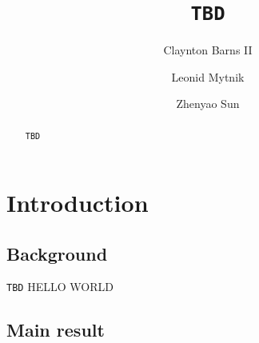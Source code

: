 \documentclass[12pt,a4paper]{amsart}
\numberwithin{equation}{section}
\theoremstyle{plain}
\theoremstyle{remark}
\begin{document}
	\title[]{{\tt TBD}}
	\author[]{Claynton Barns II}
	\address{{\tt TBD}}
	\author[]{Leonid Mytnik}
	\address{{\tt TBD}}
	\author[]{Zhenyao Sun}
	\address{{\tt TBD}}
\begin{abstract}
	{\tt TBD}
\end{abstract}
\maketitle
	
\section{Introduction}
\subsection{Background} 
    {\tt TBD}
    {HELLO WORLD}
\subsection{Main result} \label{sec:M} 
\end{document}

